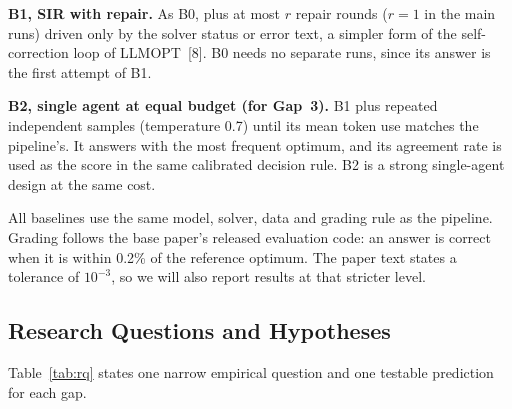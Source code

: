 \documentclass[11pt,a4paper]{article}
\begin{document}
\textbf{B1, SIR with repair.} As B0, plus at most $r$ repair rounds ($r = 1$ in the main runs) driven only by the solver status or error text, a simpler form of the self-correction loop of LLMOPT~[8]. B0 needs no separate runs, since its answer is the first attempt of B1.

\textbf{B2, single agent at equal budget (for Gap~3).} B1 plus repeated independent samples (temperature 0.7) until its mean token use matches the pipeline's. It answers with the most frequent optimum, and its agreement rate is used as the score in the same calibrated decision rule. B2 is a strong single-agent design at the same cost.

All baselines use the same model, solver, data and grading rule as the pipeline. Grading follows the base paper's released evaluation code: an answer is correct when it is within 0.2\% of the reference optimum. The paper text states a tolerance of $10^{-3}$, so we will also report results at that stricter level.

\subsection{Research Questions and Hypotheses}

Table~\ref{tab:rq} states one narrow empirical question and one testable prediction for each gap.
\end{document}
